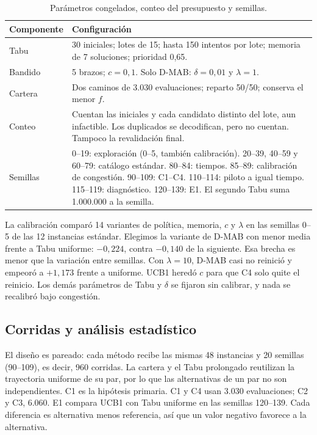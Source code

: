 \begin{table}[!ht]
 \centering\footnotesize
 \caption{Parámetros congelados, conteo del presupuesto y semillas.}
 \label{tab:parametros}
 \begin{tabular}{@{}p{}p{}@{}}
  \toprule
  Componente & Configuración\\
  \midrule
  Tabu & 30 iniciales; lotes de 15; hasta 150 intentos por lote; memoria de 7 soluciones; prioridad 0,65.\\
  Bandido & 5 brazos; $c=0{,}1$. Solo D-MAB: $\delta=0{,}01$ y $\lambda=1$.\\
  Cartera & Dos caminos de 3.030 evaluaciones; reparto 50/50; conserva el menor $f$.\\
  Conteo & Cuentan las iniciales y cada candidato distinto del lote, aun infactible. Los duplicados se decodifican, pero no cuentan. Tampoco la revalidación final.\\
  Semillas & 0--19: exploración (0--5, también calibración). 20--39, 40--59 y 60--79: catálogo estándar. 80--84: tiempos. 85--89: calibración de congestión. 90--109: C1--C4. 110--114: piloto a igual tiempo. 115--119: diagnóstico. 120--139: E1. El segundo Tabu suma 1.000.000 a la semilla.\\
  \bottomrule
 \end{tabular}
\end{table}

La calibración comparó 14 variantes de política, memoria, $c$ y $\lambda$ en las
semillas 0--5 de las 12 instancias estándar. Elegimos la variante de D-MAB con menor
media frente a Tabu uniforme: $-0{,}224$, contra $-0{,}140$ de la siguiente. Esa
brecha es menor que la variación entre semillas. Con $\lambda=10$, D-MAB casi no
reinició y empeoró a $+1{,}173$ frente a uniforme. UCB1 heredó $c$ para que C4 solo quite el reinicio. Los
demás parámetros de Tabu y $\delta$ se fijaron sin calibrar, y nada se recalibró
bajo congestión.

\subsection{Corridas y análisis estadístico}
\label{subsec:estadistica}
El diseño es pareado: cada método recibe las mismas 48 instancias y 20 semillas
(90--109), es decir, 960 corridas. La cartera y el Tabu prolongado reutilizan la
trayectoria uniforme de su par, por lo que las alternativas de un par no son independientes.
C1 es la hipótesis primaria. C1 y C4 usan 3.030
evaluaciones; C2 y C3, 6.060. E1 compara UCB1 con Tabu uniforme en las semillas
120--139. Cada diferencia es alternativa menos referencia, así que un valor negativo
favorece a la alternativa.

